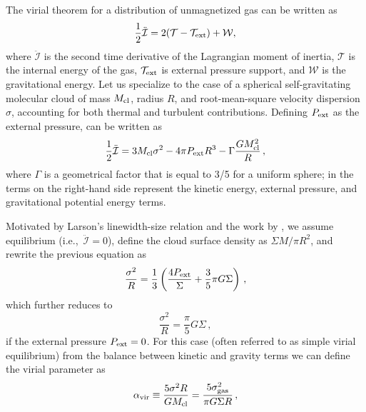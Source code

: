 \IfFileExists{emulateapjlegacy.cls}{\documentclass[iop]{emulateapjlegacy}}{\documentclass[iop]{emulateapj}}
\begin{document}
The virial theorem for a distribution of unmagnetized gas can be written as \citep{McKee92a}
\begin{equation}\label{eqn:virial_th_general}
\frac{1}{2}\ddot{\mathcal{I}} = 2(\mathcal{T} - \mathcal{T}_{\rm ext}) + \mathcal{W},
\end{equation}
where $\ddot{\mathcal{I}}$ is the second time derivative of the Lagrangian moment of inertia, $\mathcal{T}$ is the internal energy of the gas, $\mathcal{T}_{\rm ext}$ is external pressure support, and $\mathcal{W}$ is the gravitational energy.
%
Let us specialize to the case of a spherical self-gravitating molecular cloud of mass $M_{\rm cl}$, radius $R$, and root-mean-square velocity dispersion $\sigma$, accounting for both thermal and turbulent contributions. 
Defining $P_{\rm ext}$ as the external pressure,  can be written as
\begin{equation}
\frac{1}{2}{\ddot{\mathcal{I}}} = 3 M_{\rm cl} \sigma^2 - 4\pi P_{\rm ext} R^3 - \Gamma\frac{GM_{\rm cl}^2}{R}\,,
\label{eqn:virial}
\end{equation}
where $\Gamma$ is a geometrical factor that is equal to 3/5 for a uniform sphere; in  the terms on the right-hand side represent the
    kinetic energy, external pressure, and gravitational potential energy terms.

Motivated by Larson's linewidth-size relation \citep{Larson81a} and the work by \citet{Heyer09a}, we assume equilibrium (i.e.,\ ${\ddot{\mathcal{I}}}=0$), define the cloud surface density as
$\Sigma$\eq$M/\pi R^2$, and rewrite the previous equation as 
\begin{equation}
\frac{\sigma^2}{R} = \frac{1}{3}\left(\frac{4P_{\rm ext}}{\Sigma} + \frac{3}{5} \pi G \Sigma \right)\,,
\label{eqn:v0}
\end{equation}
which further reduces to 
\begin{equation}
\frac{\sigma^2}{R} = \frac{\pi}{5} G \Sigma\,,
\label{eqn:SVE}
\end{equation}
if the external pressure $P_{\rm ext}=0$. For this case (often referred to as simple virial equilibrium) from the balance between kinetic and gravity terms we can define the virial parameter as 
\begin{equation}
\alpha_{\rm vir} \equiv  \frac{5\sigma^2R}{GM_{\rm cl}} = \frac{5\sigma_{\rm gas}^2}{\pi G \Sigma R}\,,
\label{eqn:alpha}
\end{equation}
\end{document}

